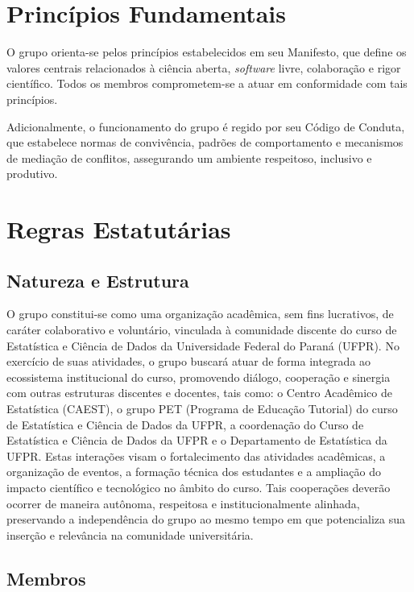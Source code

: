 \documentclass[
  12pt,          %
  a4paper,       %
  oneside,       %
  brazil         %
]{article}
\begin{document}
\section{Princípios Fundamentais}

O grupo orienta-se pelos princípios estabelecidos em seu Manifesto, que define os valores centrais relacionados à ciência aberta, \textit{software} livre, 
colaboração e rigor científico. Todos os membros comprometem-se a atuar em conformidade com tais princípios.

Adicionalmente, o funcionamento do grupo é regido por seu Código de Conduta, que estabelece normas de convivência, padrões de comportamento e 
mecanismos de mediação de conflitos, assegurando um ambiente respeitoso, inclusivo e produtivo.

\section{Regras Estatutárias}

\subsection{Natureza e Estrutura}

O grupo constitui-se como uma organização acadêmica, sem fins lucrativos, de caráter colaborativo e voluntário, vinculada à comunidade 
discente do curso de Estatística e Ciência de Dados da Universidade Federal do Paraná (UFPR). 
No exercício de suas atividades, o grupo buscará atuar de forma integrada ao ecossistema institucional do curso, promovendo diálogo, 
cooperação e sinergia com outras estruturas discentes e docentes, tais como: o Centro Acadêmico de Estatística (CAEST), o grupo PET 
(Programa de Educação Tutorial) do curso de Estatística e Ciência de Dados da UFPR, 
a coordenação do Curso de Estatística e Ciência de Dados da UFPR e o Departamento de Estatística da UFPR. Estas interações visam o 
fortalecimento das atividades acadêmicas, a organização de eventos, a formação técnica dos estudantes 
e a ampliação do impacto científico e tecnológico no âmbito do curso. Tais cooperações deverão ocorrer de maneira autônoma, 
respeitosa e institucionalmente alinhada, preservando a independência do grupo ao mesmo tempo em que potencializa sua inserção 
e relevância na comunidade universitária.

\subsection{Membros}
\end{document}
